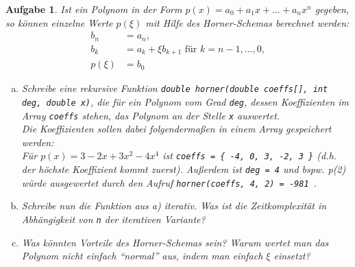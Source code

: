 \documentclass[a4paper,12pt,parskip=full]{scrartcl}
\theoremstyle{exercise}
\newtheorem{exercise}{Aufgabe}
\begin{document}
\begin{exercise}
Ist ein Polynom in der Form
$p(x) = a_0 + a_1 x + \dots + a_nx^n$ gegeben, so können einzelne
Werte $p(\xi)$ mit Hilfe des \emph{Horner-Schemas} berechnet werden:
\begin{align*}
  b_n &= a_n, \\
  b_k &= a_k + \xi b_{k+1} \text{ für } k = n-1, \dots, 0, \\
  p(\xi) &= b_0
\end{align*}
\begin{enumerate}[a)\ ]
\item
  Schreibe eine rekursive Funktion \lstinline{double horner(double coeffs[], int deg, double x)}, die für ein Polynom vom Grad \lstinline{deg}, dessen Koeffizienten im Array \lstinline{coeffs} stehen, das Polynom an der Stelle \lstinline{x} auswertet. \\
  Die Koeffizienten sollen dabei folgendermaßen in einem Array gespeichert werden: \\
  Für $p(x) = 3 - 2x + 3x^2 - 4x^4$ ist \lstinline|coeffs = { -4, 0, 3, -2, 3 }|
  (d.h. der höchste Koeffizient kommt zuerst). Außerdem
  ist \lstinline{deg = 4} und bspw. p(2) würde ausgewertet durch den
  Aufruf \lstinline{horner(coeffs, 4, 2) = -981 }.
  
\item Schreibe nun die Funktion aus a) iterativ. Was ist die
  Zeitkomplexität in Abhängigkeit von \texttt{n} der iterativen
  Variante?
\item[c)*] Was könnten Vorteile des Horner-Schemas sein? Warum wertet
  man das Polynom nicht einfach ``normal'' aus, indem man einfach
  $\xi$ einsetzt?
\end{enumerate}
\end{exercise}
\end{document}
